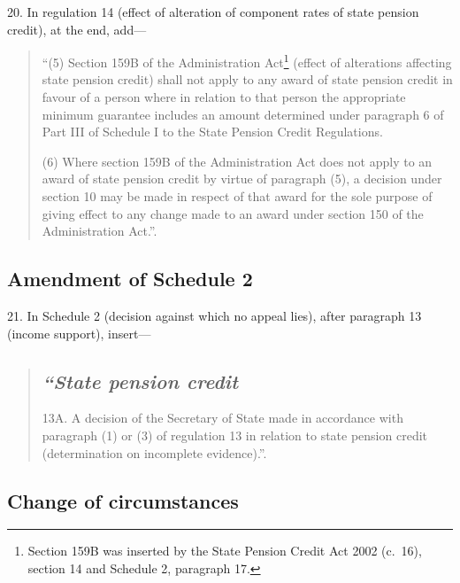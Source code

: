 \documentclass[12pt,a4paper]{article}
\begin{document}
20.  In regulation 14 (effect of alteration of component rates of state pension credit), at the end, add—
\begin{quotation}
“(5) Section 159B of the Administration Act\footnote{Section 159B was inserted by the State Pension Credit Act 2002 (c.\ 16), section 14 and Schedule 2, paragraph 17.} (effect of alterations affecting state pension credit) shall not apply to any award of state pension credit in favour of a person where in relation to that person the appropriate minimum guarantee includes an amount determined under paragraph 6 of Part III of Schedule I to the State Pension Credit Regulations.

(6) Where section 159B of the Administration Act does not apply to an award of state pension credit by virtue of paragraph (5), a decision under section 10 may be made in respect of that award for the sole purpose of giving effect to any change made to an award under section 150 of the Administration Act.”.
\end{quotation}

\subsection[21. Amendment of Schedule 2]{Amendment of Schedule 2}

21.  In Schedule 2 (decision against which no appeal lies), after paragraph 13 (income support), insert—
\begin{quotation}
\subsection*{\itshape “State pension credit}

13A.  A decision of the Secretary of State made in accordance with paragraph (1) or (3) of regulation 13 in relation to state pension credit (determination on incomplete evidence).”.
\end{quotation}

\subsection[22. Change of circumstances]{Change of circumstances}
\end{document}
